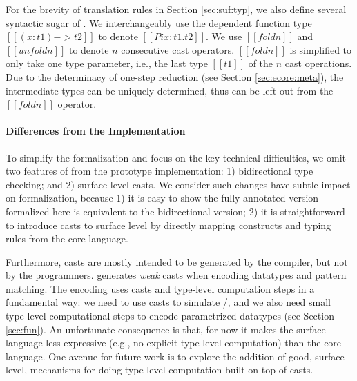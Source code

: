 For the brevity of translation rules in Section \ref{sec:suf:typ},
we also define several syntactic sugar of \ecore.
We interchangeably use the dependent function type $[[(x:t1) -> t2]]$
to denote $[[Pi x:t1.t2]]$. We use $[[foldn]]$ and $[[unfoldn]]$ to denote
$n$ consecutive cast operators. $[[foldn]]$ is simplified to only take
one type parameter, i.e., the last type $[[t1]]$ of the $n$ cast operations.
Due to the determinacy of one-step reduction (see Section 
\ref{sec:ecore:meta}), the intermediate types can be uniquely determined, 
thus can be left out from the $[[foldn]]$ operator.

\paragraph{Differences from the Implementation}
To simplify the formalization and focus on the key technical
difficulties, we omit two features of \sufcc from the prototype
implementation: 1) bidirectional type checking; and 2) surface-level
casts. We consider such changes have subtle impact on formalization,
because 1) it is easy to show the fully annotated version formalized
here is equivalent to the bidirectional version; 2) it is
straightforward to introduce casts to surface level by directly
mapping constructs and typing rules from the core language.

Furthermore, casts are mostly intended to be generated by the
compiler, but not by the programmers. \sufcc generates \emph{weak}
casts when encoding datatypes and pattern matching. The encoding uses
casts and type-level computation steps in a fundamental way: we need
to use casts to simulate \fold/\unfold, and we also need small
type-level computational steps to encode parametrized datatypes (see
Section \ref{sec:fun}). An unfortunate consequence is that, for now it
makes the surface language less expressive (e.g., no explicit
type-level computation) than the core language. One avenue for future
work is to explore the addition of good, surface level, mechanisms for
doing type-level computation built on top of casts.

